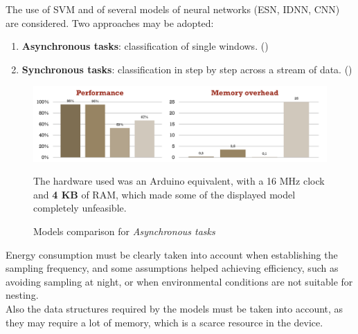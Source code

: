 \begin{paracol}{2}
   

   The use of SVM and of several models of neural networks (ESN, IDNN, CNN) are considered. Two approaches may be adopted:
   \begin{enumerate}
      \item \textbf{Asynchronous tasks}: classification of single windows. ()
      \item \textbf{Synchronous tasks}: classification in step by step across a stream of data. ()
   \end{enumerate}
   
   \switchcolumn

   \begin{figure}[htbp]
      \centering
      \includegraphics{images/tortoise@_modelcomparison.png}
      \caption{Models comparison for \textit{Asynchronous tasks}}
      \label{fig:tortoise@_modelcomparison}
      The hardware used was an Arduino equivalent, with a 16 MHz clock and \textbf{4 KB} of RAM, which made some of the displayed model completely unfeasible.
   \end{figure}
\end{paracol}

Energy consumption must be clearly taken into account when establishing the sampling frequency, and some assumptions helped achieving efficiency, such as avoiding sampling at night, or when environmental conditions are not suitable for nesting.\\
Also the data structures required by the models must be taken into account, as they may require a lot of memory, which is a scarce resource in the device.

